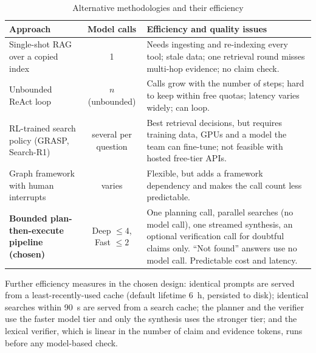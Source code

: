 \begin{table}[!htbp]
\begin{center}
\def\arraystretch{1.3}
\small
\begin{tabularx}{\textwidth}{| p{3.2cm} | c | X |}
\hline
Approach & Model calls & Efficiency and quality issues \\ \hline
Single-shot RAG over a copied index & 1 & Needs ingesting and re-indexing every tool; stale data; one retrieval round misses multi-hop evidence; no claim check. \\ \hline
Unbounded ReAct loop & $n$ (unbounded) & Calls grow with the number of steps; hard to keep within free quotas; latency varies widely; can loop. \\ \hline
RL-trained search policy (GRASP, Search-R1) & several per question & Best retrieval decisions, but requires training data, GPUs and a model the team can fine-tune; not feasible with hosted free-tier APIs. \\ \hline
Graph framework with human interrupts & varies & Flexible, but adds a framework dependency and makes the call count less predictable. \\ \hline
\textbf{Bounded plan-then-execute pipeline (chosen)} & Deep $\le 4$, Fast $\le 2$ & One planning call, parallel searches (no model call), one streamed synthesis, an optional verification call for doubtful claims only. ``Not found'' answers use no model call. Predictable cost and latency. \\ \hline
\end{tabularx}
\end{center}
\caption{Alternative methodologies and their efficiency}
\label{tab:approaches}
\end{table}

Further efficiency measures in the chosen design: identical prompts are served from a least-recently-used cache (default lifetime 6~h, persisted to disk); identical searches within 90~s are served from a search cache; the planner and the verifier use the faster model tier and only the synthesis uses the stronger tier; and the lexical verifier, which is linear in the number of claim and evidence tokens, runs before any model-based check.

